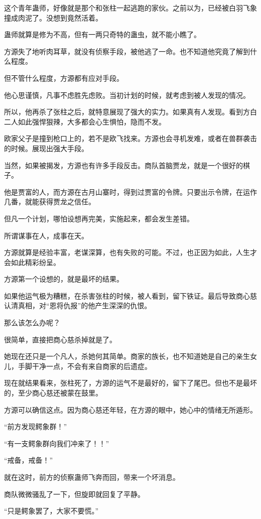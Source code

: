 \begin{this_body}
这个青年蛊师，好像就是那个和张柱一起逃跑的家伙。之前以为，已经被白羽飞象撞成肉泥了。没想到竟然活着。

蛊师就算是修为不高，但有一两只奇特的蛊虫，就不能小瞧了。

方源失了地听肉耳草，就没有侦察手段，被他逃了一命。也不知道他究竟了解到什么程度。

但不管什么程度，方源都有应对手段。

他心思谨慎，凡事不虑胜先虑败。当初计划的时候，就考虑到被人发现的情况。

所以，他再杀了张柱之后，就特意展现了强大的实力。如果真有人发现。看到方白二人如此强悍狠辣，大多都会心生惧怕，隐而不发。

欧家父子是撞到枪口上的，若不是欧飞找来。方源也会寻机发难，或者在兽群袭击的时候。展现出强大手段。

当然，如果被揭发，方源也有许多手段反击。商队首脑贾龙，就是一个很好的棋子。

他是贾富的人，而方源在古月山寨时，得到过贾富的令牌。只要出示令牌，在运作几番，就能获得贾龙之信任。

但凡一个计划，哪怕设想再完美，实施起来，都会发生差错。

所谓谋事在人，成事在天。

方源就算是经验丰富，老谋深算，也有失败的可能。不过，也正因为如此，人生才会如此精彩纷呈。

方源第一个设想的，就是最坏的结果。

如果他运气极为糟糕，在杀害张柱的时候，被人看到，留下铁证。最后导致商心慈认清真相，对“恩将仇报”的他产生深深的仇恨。

那么该怎么办呢？

很简单，直接把商心慈杀掉就是了。

她现在还只是一个凡人，杀她何其简单。商家的族长，也不知道她是自己的亲生女儿，手脚干净一点，不会有来自商家的后遗症。

现在就结果看来，张柱死了，方源的运气不是最好的，留下了尾巴。但也不是最坏的，至少商心慈还被蒙在鼓里。

方源可以确信这点。因为商心慈还年轻，在方源的眼中，她心中的情绪无所遁形。

“前方发现鳄象群！”

“有一支鳄象群向我们冲来了！！”

“戒备，戒备！”

就在这时，前方的侦察蛊师飞奔而回，带来一个坏消息。

商队微微骚乱了一下，但旋即就回复了平静。

“只是鳄象罢了，大家不要慌。”


\end{this_body}
